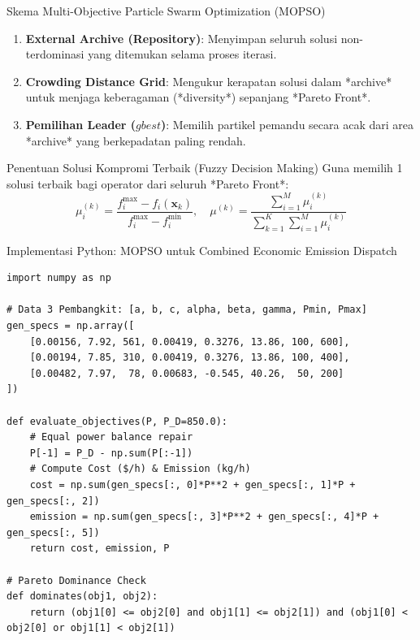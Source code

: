 \documentclass[10pt,aspectratio=169]{beamer}
\begin{document}
\begin{frame}{Skema Multi-Objective Particle Swarm Optimization (MOPSO)}
    \begin{tcolorbox}[colback=unibgold!10,colframe=unibgold!80!black,title=\textbf{Mekanisme Khusus MOPSO}]
        \begin{enumerate}
            \item \textbf{External Archive (Repository)}: Menyimpan seluruh solusi non-terdominasi yang ditemukan selama proses iterasi.
            \item \textbf{Crowding Distance Grid}: Mengukur kerapatan solusi dalam *archive* untuk menjaga keberagaman (*diversity*) sepanjang *Pareto Front*.
            \item \textbf{Pemilihan Leader ($gbest$)}: Memilih partikel pemandu secara acak dari area *archive* yang berkepadatan paling rendah.
        \end{enumerate}
    \end{tcolorbox}

    \vspace{0.2cm}
    \begin{block}{Penentuan Solusi Kompromi Terbaik (Fuzzy Decision Making)}
        Guna memilih 1 solusi terbaik bagi operator dari seluruh *Pareto Front*:
        \[
            \mu_i^{(k)} = \frac{f_i^{\max} - f_i(\mathbf{x}_k)}{f_i^{\max} - f_i^{\min}}, \quad \mu^{(k)} = \frac{\sum_{i=1}^M \mu_i^{(k)}}{\sum_{k=1}^K \sum_{i=1}^M \mu_i^{(k)}}
        \]
    \end{block}
\end{frame}

\begin{frame}[fragile]{Implementasi Python: MOPSO untuk Combined Economic Emission Dispatch}
\begin{lstlisting}
import numpy as np

# Data 3 Pembangkit: [a, b, c, alpha, beta, gamma, Pmin, Pmax]
gen_specs = np.array([
    [0.00156, 7.92, 561, 0.00419, 0.3276, 13.86, 100, 600],
    [0.00194, 7.85, 310, 0.00419, 0.3276, 13.86, 100, 400],
    [0.00482, 7.97,  78, 0.00683, -0.545, 40.26,  50, 200]
])

def evaluate_objectives(P, P_D=850.0):
    # Equal power balance repair
    P[-1] = P_D - np.sum(P[:-1])
    # Compute Cost ($/h) & Emission (kg/h)
    cost = np.sum(gen_specs[:, 0]*P**2 + gen_specs[:, 1]*P + gen_specs[:, 2])
    emission = np.sum(gen_specs[:, 3]*P**2 + gen_specs[:, 4]*P + gen_specs[:, 5])
    return cost, emission, P

# Pareto Dominance Check
def dominates(obj1, obj2):
    return (obj1[0] <= obj2[0] and obj1[1] <= obj2[1]) and (obj1[0] < obj2[0] or obj1[1] < obj2[1])
\end{lstlisting}
\end{frame}
\end{document}
